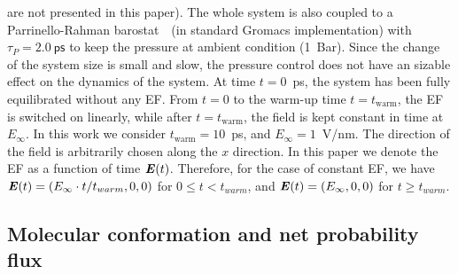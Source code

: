 \documentclass[journal=jctcce,manuscript=manuscript]{achemso}
\newcommand{\vect}[1]{\textbf{\textit{#1}}}
\begin{document}
are not presented in this paper).
The whole system is also coupled to a Parrinello-Rahman barostat~\cite{parrinello1981polymorphic}~(in standard Gromacs implementation) with $\tau_P = 2.0~\textsf{ps}$ to keep
the pressure at ambient condition (1~Bar). Since the
change of the system size is small and slow, the pressure control
does not have an sizable effect on the
dynamics of the system.
At time $t=0$~ps, the system
has been fully equilibrated without any EF. From $t=0$ to
the warm-up time $t=t_{\textrm{warm}}$, the EF is switched on linearly, while
after $t=t_{\textrm{warm}}$, the field is kept constant in time at
$E_{\infty}$.  In this work we consider $t_{\textrm{warm}} = 10$~ps,
and $E_{\infty} = 1$~V/nm.
The direction of the field is arbitrarily chosen along the
$x$ direction.
In this paper we denote the
EF as a function of time $\vect E(t)$.
Therefore, for the case of constant EF, we have
$\vect E(t) = (E_\infty\cdot t/t_{warm},0,0)$ for $0\leq t < t_{warm}$, and 
$\vect E(t) = (E_\infty,0,0)$
for $t \geq t_{warm}$.


\subsection{Molecular conformation and net probability flux}
\end{document}
